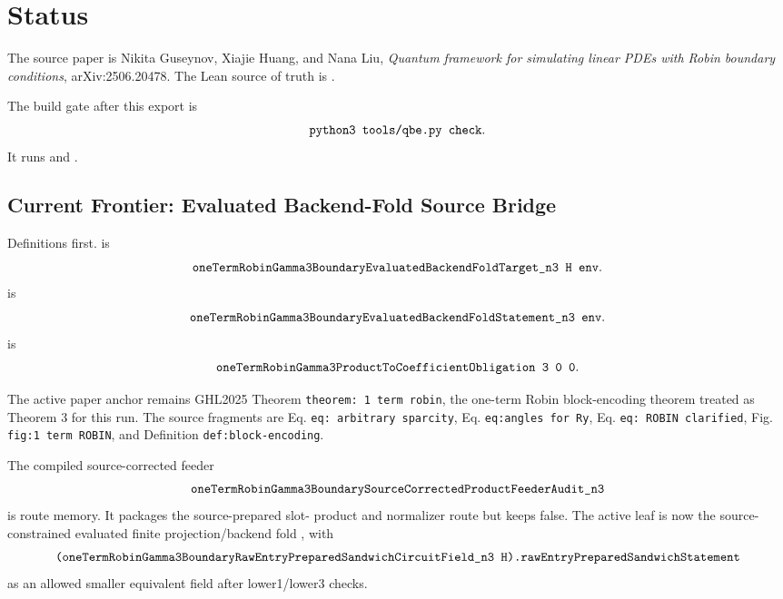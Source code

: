 \section{Status}

The source paper is Nikita Guseynov, Xiajie Huang, and Nana Liu,
\emph{Quantum framework for simulating linear PDEs with Robin boundary
conditions}, arXiv:2506.20478.  The Lean source of truth is
.

The build gate after this export is
\[
  \texttt{python3 tools/qbe.py check}.
\]
It runs  and .

\subsection{Current Frontier: Evaluated Backend-Fold Source Bridge}

Definitions first.   is
\[
  \Lean{oneTermRobinGamma3BoundaryEvaluatedBackendFoldTarget\_n3\ H\ env}.
\]
 is
\[
  \Lean{oneTermRobinGamma3BoundaryEvaluatedBackendFoldStatement\_n3\ env}.
\]
 is
\[
  \Lean{oneTermRobinGamma3ProductToCoefficientObligation\ 3\ 0\ 0}.
\]

The active paper anchor remains GHL2025 Theorem
\texttt{theorem: 1 term robin}, the one-term Robin block-encoding theorem
treated as Theorem 3 for this run.  The source fragments are Eq.
\texttt{eq: arbitrary sparcity}, Eq. \texttt{eq:angles for Ry}, Eq.
\texttt{eq: ROBIN clarified}, Fig. \texttt{fig:1 term ROBIN}, and Definition
\texttt{def:block-encoding}.

The compiled source-corrected feeder
\[
  \texttt{oneTermRobinGamma3BoundarySourceCorrectedProductFeederAudit\_n3}
\]
is route memory.  It packages the source-prepared slot- product and
normalizer route but keeps  false.  The active
leaf is now the source-constrained evaluated finite projection/backend fold
, with
\[
  \Lean{(oneTermRobinGamma3BoundaryRawEntryPreparedSandwichCircuitField\_n3\ H).rawEntryPreparedSandwichStatement}
\]
as an allowed smaller equivalent field after lower1/lower3 checks.

